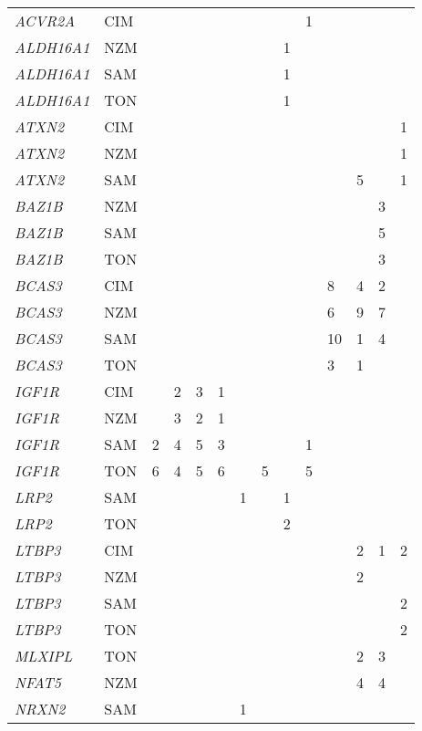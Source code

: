 \documentclass[]{report}
\begin{document}
\begin{ThreePartTable}
\begin{longtable}[t]{llllllllllllll}
\em{ACVR2A} & CIM &  &  &  &  &  &  &  & 1 &  &  &  & \\
\em{ALDH16A1} & NZM &  &  &  &  &  &  & 1 &  &  &  &  & \\
\em{ALDH16A1} & SAM &  &  &  &  &  &  & 1 &  &  &  &  & \\
\em{ALDH16A1} & TON &  &  &  &  &  &  & 1 &  &  &  &  & \\
\em{ATXN2} & CIM &  &  &  &  &  &  &  &  &  &  &  & 1\\
\em{ATXN2} & NZM &  &  &  &  &  &  &  &  &  &  &  & 1\\
\em{ATXN2} & SAM &  &  &  &  &  &  &  &  &  & 5 &  & 1\\
\em{BAZ1B} & NZM &  &  &  &  &  &  &  &  &  &  & 3 & \\
\em{BAZ1B} & SAM &  &  &  &  &  &  &  &  &  &  & 5 & \\
\em{BAZ1B} & TON &  &  &  &  &  &  &  &  &  &  & 3 & \\
\em{BCAS3} & CIM &  &  &  &  &  &  &  &  & 8 & 4 & 2 & \\
\em{BCAS3} & NZM &  &  &  &  &  &  &  &  & 6 & 9 & 7 & \\
\em{BCAS3} & SAM &  &  &  &  &  &  &  &  & 10 & 1 & 4 & \\
\em{BCAS3} & TON &  &  &  &  &  &  &  &  & 3 & 1 &  & \\
\em{IGF1R} & CIM &  & 2 & 3 & 1 &  &  &  &  &  &  &  & \\
\em{IGF1R} & NZM &  & 3 & 2 & 1 &  &  &  &  &  &  &  & \\
\em{IGF1R} & SAM & 2 & 4 & 5 & 3 &  &  &  & 1 &  &  &  & \\
\em{IGF1R} & TON & 6 & 4 & 5 & 6 &  & 5 &  & 5 &  &  &  & \\
\em{LRP2} & SAM &  &  &  &  & 1 &  & 1 &  &  &  &  & \\
\em{LRP2} & TON &  &  &  &  &  &  & 2 &  &  &  &  & \\
\em{LTBP3} & CIM &  &  &  &  &  &  &  &  &  & 2 & 1 & 2\\
\em{LTBP3} & NZM &  &  &  &  &  &  &  &  &  & 2 &  & \\
\em{LTBP3} & SAM &  &  &  &  &  &  &  &  &  &  &  & 2\\
\em{LTBP3} & TON &  &  &  &  &  &  &  &  &  &  &  & 2\\
\em{MLXIPL} & TON &  &  &  &  &  &  &  &  &  & 2 & 3 & \\
\em{NFAT5} & NZM &  &  &  &  &  &  &  &  &  & 4 & 4 & \\
\em{NRXN2} & SAM &  &  &  &  & 1 &  &  &  &  &  &  & \\

\end{longtable}
\end{ThreePartTable}
\end{document}
